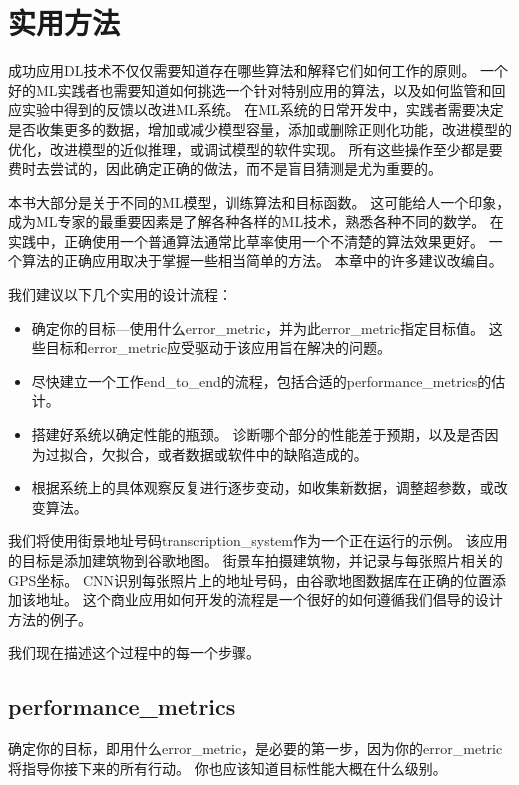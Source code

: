 \chapter{实用方法}
\label{chap:practical_methodology}
成功应用\gls{DL}技术不仅仅需要知道存在哪些算法和解释它们如何工作的原则。
一个好的\gls{ML}实践者也需要知道如何挑选一个针对特别应用的算法，以及如何监管和回应实验中得到的反馈以改进\gls{ML}系统。
在\gls{ML}系统的日常开发中，实践者需要决定是否收集更多的数据，增加或减少模型容量，添加或删除正则化功能，改进模型的优化，改进模型的近似推理，或调试模型的软件实现。
所有这些操作至少都是要费时去尝试的，因此确定正确的做法，而不是盲目猜测是尤为重要的。

本书大部分是关于不同的\gls{ML}模型，训练算法和目标函数。
这可能给人一个印象，成为\gls{ML}专家的最重要因素是了解各种各样的\gls{ML}技术，熟悉各种不同的数学。
在实践中，正确使用一个普通算法通常比草率使用一个不清楚的算法效果更好。
一个算法的正确应用取决于掌握一些相当简单的方法。
本章中的许多建议改编自\cite{ng-lecture-advice}。

我们建议以下几个实用的设计流程：
\begin{itemize}
\item 确定你的目标---使用什么\gls{error_metric}，并为此\gls{error_metric}指定目标值。
这些目标和\gls{error_metric}应受驱动于该应用旨在解决的问题。


\item 尽快建立一个工作\gls{end_to_end}的流程，包括合适的\gls{performance_metrics}的估计。

\item 搭建好系统以确定性能的瓶颈。
诊断哪个部分的性能差于预期，以及是否因为过拟合，欠拟合，或者数据或软件中的缺陷造成的。

\item 根据系统上的具体观察反复进行逐步变动，如收集新数据，调整超参数，或改变算法。
\end{itemize}

我们将使用街景地址号码\gls{transcription_system}\citep{Goodfellow+et+al-ICLR2014a}作为一个正在运行的示例。
该应用的目标是添加建筑物到谷歌地图。
街景车拍摄建筑物，并记录与每张照片相关的GPS坐标。
\gls{CNN}识别每张照片上的地址号码，由谷歌地图数据库在正确的位置添加该地址。
这个商业应用如何开发的流程是一个很好的如何遵循我们倡导的设计方法的例子。

我们现在描述这个过程中的每一个步骤。

\section{\gls{performance_metrics}}
\label{sec:performance_metrics}
确定你的目标，即用什么\gls{error_metric}，是必要的第一步，因为你的\gls{error_metric}将指导你接下来的所有行动。
你也应该知道目标性能大概在什么级别。

